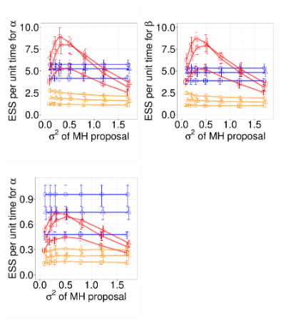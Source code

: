 {%
  \begin{figure}%
  \centering
  \begin{minipage}[hp]{0.78\linewidth}
  \centering
    \includegraphics [width=0.44\textwidth, angle=0]{figures_new_apr12/Q_alpha_dim3_18apr12.pdf}
    \includegraphics [width=0.44\textwidth, angle=0]{figures_new_apr12/Q_beta_dim3_18apr12.pdf}
  \centering
    \includegraphics [width=0.44\textwidth, angle=0]{figures_new_apr12/Q_alpha_dim10_18apr12.pdf}

\end{minipage}
\end{figure}}
